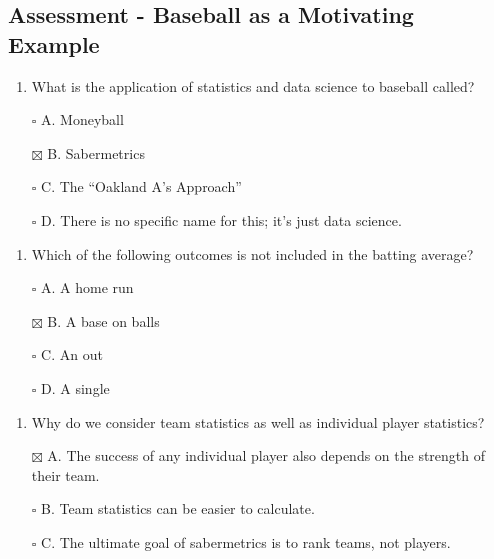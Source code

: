 \documentclass[
]{article}
\providecommand{\tightlist}{%
  \setlength{\itemsep}{0pt}\setlength{\parskip}{0pt}}
\begin{document}
\hypertarget{assessment---baseball-as-a-motivating-example}{%
\subsection{Assessment - Baseball as a Motivating
Example}\label{assessment---baseball-as-a-motivating-example}}

\begin{enumerate}
\def\labelenumi{\arabic{enumi}.}
\tightlist
\item
  What is the application of statistics and data science to baseball
  called?
\end{enumerate}

\begin{itemize}
\tightlist
\item[$\square$]
  A. Moneyball
\item[$\boxtimes$]
  B. Sabermetrics
\item[$\square$]
  C. The ``Oakland A's Approach''
\item[$\square$]
  D. There is no specific name for this; it's just data science.
\end{itemize}

\begin{enumerate}
\def\labelenumi{\arabic{enumi}.}
\setcounter{enumi}{1}
\tightlist
\item
  Which of the following outcomes is not included in the batting
  average?
\end{enumerate}

\begin{itemize}
\tightlist
\item[$\square$]
  A. A home run
\item[$\boxtimes$]
  B. A base on balls
\item[$\square$]
  C. An out
\item[$\square$]
  D. A single
\end{itemize}

\begin{enumerate}
\def\labelenumi{\arabic{enumi}.}
\setcounter{enumi}{2}
\tightlist
\item
  Why do we consider team statistics as well as individual player
  statistics?
\end{enumerate}

\begin{itemize}
\tightlist
\item[$\boxtimes$]
  A. The success of any individual player also depends on the strength
  of their team.
\item[$\square$]
  B. Team statistics can be easier to calculate.
\item[$\square$]
  C. The ultimate goal of sabermetrics is to rank teams, not players.
\end{itemize}
\end{document}
